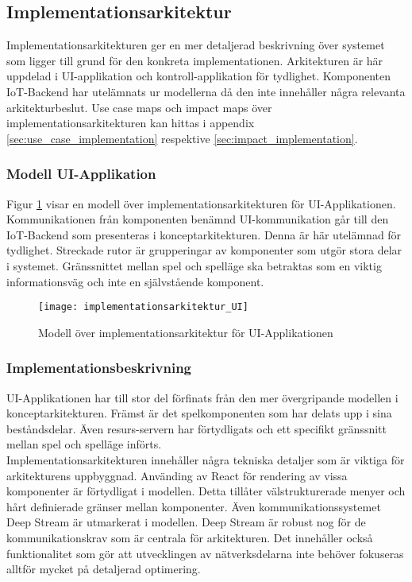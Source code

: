 \subsection{Implementationsarkitektur}
Implementationsarkitekturen ger en mer detaljerad beskrivning över systemet som ligger till grund för den konkreta implementationen. Arkitekturen är här uppdelad i UI-applikation och kontroll-applikation för tydlighet. Komponenten IoT-Backend har utelämnats ur modellerna då den inte innehåller några relevanta arkitekturbeslut. Use case maps och impact maps över implementationsarkitekturen kan hittas i appendix \ref{sec:use_case_implementation} respektive \ref{sec:impact_implementation}.

\subsubsection{Modell UI-Applikation}
Figur \ref{fig:implementationsarkitektur-UI} visar en modell över implementationsarkitekturen för UI-Applikationen. Kommunikationen från komponenten benämnd UI-kommunikation går till den IoT-Backend som presenteras i konceptarkitekturen. Denna är här utelämnad för tydlighet. Streckade rutor är grupperingar av komponenter som utgör stora delar i systemet. Gränssnittet mellan spel och spelläge ska betraktas som en viktig informationsväg och inte en självstående komponent.

\begin{figure}[h]
    \centering
    \texttt{[image: implementationsarkitektur\_UI]}
    \caption{Modell över implementationsarkitektur för UI-Applikationen}
    \label{fig:implementationsarkitektur-UI}
\end{figure}

\subsubsection{Implementationsbeskrivning}
\label{subsubsec:implementation-desc-UI}
UI-Applikationen har till stor del förfinats från den mer övergripande modellen i konceptarkitekturen. Främst är det spelkomponenten som har delats upp i sina beståndsdelar. Även resurs-servern har förtydligats och ett specifikt gränssnitt mellan spel och spelläge införts.\\

Implementationsarkitekturen innehåller några tekniska detaljer som är viktiga för arkitekturens uppbyggnad. Använding av React för rendering av vissa komponenter är förtydligat i modellen. Detta tillåter välstrukturerade menyer och hårt definierade gränser mellan komponenter. Även kommunikationssystemet Deep Stream är utmarkerat i modellen. Deep Stream är robust nog för de kommunikationskrav som är centrala för arkitekturen. Det innehåller också funktionalitet som gör att utvecklingen av nätverksdelarna inte behöver fokuseras alltför mycket på detaljerad optimering.\\

